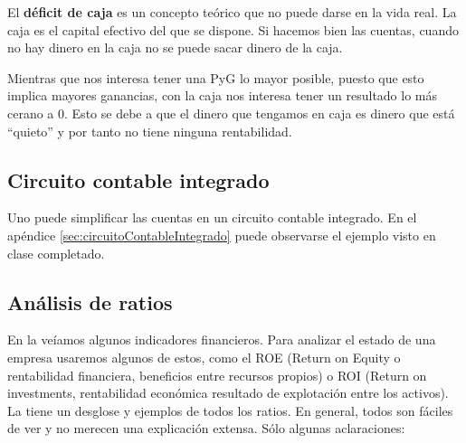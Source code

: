 \documentclass[nochap,palatino,shortheader]{apuntes}
\newcommand{\study}[1]{#1} \newcommand{\substudy}[1]{#1}
\begin{document}
El \textbf{\study{déficit de caja}} es un \substudy{concepto teórico que no puede darse en la vida real}. 
La caja es el capital efectivo del que se dispone. Si hacemos bien las cuentas, cuando no hay dinero en la caja no se puede sacar dinero de la caja.

\obs Mientras que nos \study{interesa} tener una \study{PyG lo mayor posible}, puesto que esto implica mayores ganancias, con la \study{caja} nos interesa tener un resultado lo más \study{cerano a 0}. 
Esto se debe a que el dinero que tengamos en caja es dinero que está ``quieto'' y por tanto no tiene ninguna rentabilidad.

\subsection{Circuito contable integrado}

Uno puede simplificar las cuentas en un circuito contable integrado. En el apéndice \ref{sec:circuitoContableIntegrado} puede observarse el ejemplo visto en clase completado.

\subsection{Análisis de ratios}

En la  veíamos algunos indicadores financieros. Para analizar el estado de una empresa usaremos algunos de estos, como el ROE (Return on Equity o rentabilidad financiera, beneficios entre recursos propios) o ROI (Return on investments, rentabilidad económica resultado de explotación entre los activos). La  tiene un desglose y ejemplos de todos los ratios. En general, todos son fáciles de ver y no merecen una explicación extensa. Sólo algunas aclaraciones:
\end{document}
